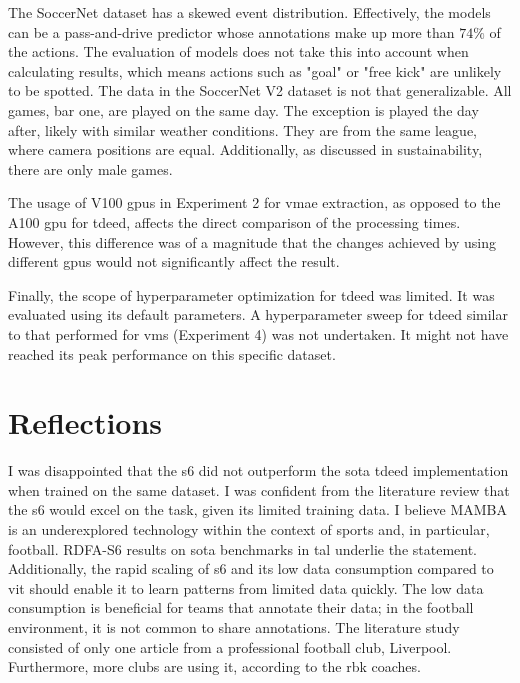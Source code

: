The SoccerNet dataset has a skewed event distribution. Effectively, the models can be a pass-and-drive predictor whose annotations make up more than $74\%$ of the actions. The evaluation of models does not take this into account when calculating results, which means actions such as "goal" or "free kick" are unlikely to be spotted. The data in the SoccerNet V2 dataset is not that generalizable. All games, bar one, are played on the same day. The exception is played the day after, likely with similar weather conditions. They are from the same league, where camera positions are equal. Additionally, as discussed in sustainability, there are only male games. 

The usage of V100 \acrshort{gpu}s in Experiment 2 for \acrshort{vmae} extraction, as opposed to the A100 \acrshort{gpu} for \acrshort{tdeed}, affects the direct comparison of the processing times. However, this difference was of a magnitude that the changes achieved by using different \acrshort{gpu}s would not significantly affect the result. 

Finally, the scope of hyperparameter optimization for \acrshort{tdeed} was limited. It was evaluated using its default parameters. A hyperparameter sweep for \acrshort{tdeed} similar to that performed for \acrshort{vms} (Experiment 4) was not undertaken. It might not have reached its peak performance on this specific dataset. 

\section{Reflections}

I was disappointed that the \acrfull{s6} did not outperform the \acrshort{sota} \acrshort{tdeed} implementation when trained on the same dataset. I was confident from the literature review that the \acrshort{s6} would excel on the task, given its limited training data. I believe MAMBA is an underexplored technology within the context of sports\cite{survey_of_survey} and, in particular, football\cite{seweryn_survey_2023}. RDFA-S6\cite{lee_enhancing_mamba_s6_2024} results on \acrshort{sota} benchmarks in \acrshort{tal} underlie the statement. Additionally, the rapid scaling of \acrshort{s6} and its low data consumption compared to \acrfull{vit} should enable it to learn patterns from limited data quickly. The low data consumption is beneficial for teams that annotate their data; in the football environment, it is not common to share annotations. The literature study consisted of only one article from a professional football club, Liverpool. Furthermore, more clubs are using it, according to the \acrshort{rbk} coaches. 

